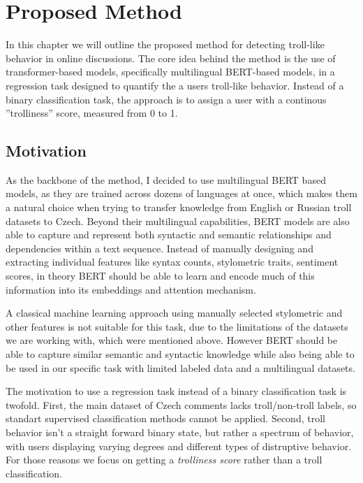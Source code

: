 \documentclass[twoside]{ctuthesis}
\theoremstyle{plain}
\theoremstyle{definition}
\theoremstyle{note}
\begin{document}
\chapter{Proposed Method}
In this chapter we will outline the proposed method for detecting troll-like behavior in online discussions. The core idea behind the method is the use of transformer-based models, specifically multilingual BERT-based models, in a regression task designed to quantify the a users troll-like behavior. Instead of a binary classification task, the approach is to assign a user with a continous ''trolliness'' score, measured from 0 to 1.\par

\section{Motivation}
As the backbone of the method, I decided to use multilingual BERT based models, as they are trained across dozens of languages at once, which makes them a natural choice when trying to transfer knowledge from English or Russian troll datasets to Czech. Beyond their multilingual capabilities, BERT models are also able to capture and represent both syntactic and semantic relationships and dependencies within a text sequence. Instead of manually designing and extracting individual features like syntax counts, stylometric traits, sentiment scores, in theory BERT should be able to learn and encode much of this information into its embeddings and attention mechanism.\cite{Rogers2020}\par
A classical machine learning approach using manually selected stylometric and other features is not suitable for this task, due to the limitations of the datasets we are working with, which were mentioned above. However BERT should be able to capture similar semantic and syntactic knowledge while also being able to be used in our specific task with limited labeled data and a multilingual datasets.\par
The motivation to use a regression task instead of a binary classification task is twofold. First, the main dataset of Czech comments lacks troll/non-troll labels, so standart supervised classification methods cannot be applied. Second, troll behavior isn't a straight forward binary state, but rather a spectrum of behavior, with users displaying varying degrees and different types of distruptive behavior. For those reasons we focus on getting a \textit{trolliness score} rather than a troll classification.\par
\end{document}
